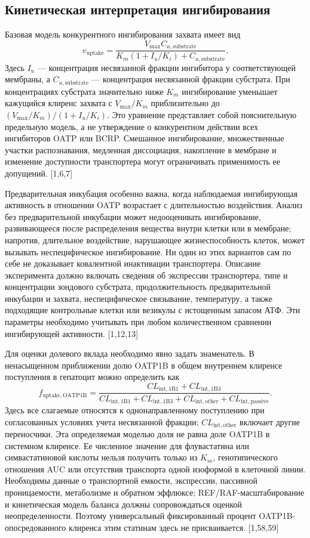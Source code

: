 \documentclass[11pt]{article}
\begin{document}
\subsection{Кинетическая интерпретация ингибирования}

Базовая модель конкурентного ингибирования захвата имеет вид
\[
v_{\mathrm{uptake}}=
\frac{V_{\max}C_{u,\mathrm{substrate}}}
{K_m\left(1+I_u/K_i\right)+C_{u,\mathrm{substrate}}}.
\]
Здесь \(I_u\) --- концентрация несвязанной фракции ингибитора у соответствующей мембраны, а \(C_{u,\mathrm{substrate}}\) --- концентрация несвязанной фракции субстрата. При концентрациях субстрата значительно ниже \(K_m\) ингибирование уменьшает кажущийся клиренс захвата с \(V_{\max}/K_m\) приблизительно до \((V_{\max}/K_m)/(1+I_u/K_i)\). Это уравнение представляет собой пояснительную предельную модель, а не утверждение о конкурентном действии всех ингибиторов OATP или BCRP. Смешанное ингибирование, множественные участки распознавания, медленная диссоциация, накопление в мембране и изменение доступности транспортера могут ограничивать применимость ее допущений. [1,6,7]

Предварительная инкубация особенно важна, когда наблюдаемая ингибирующая активность в отношении OATP возрастает с длительностью воздействия. Анализ без предварительной инкубации может недооценивать ингибирование, развивающееся после распределения вещества внутри клетки или в мембране; напротив, длительное воздействие, нарушающее жизнеспособность клеток, может вызывать неспецифическое ингибирование. Ни один из этих вариантов сам по себе не доказывает ковалентной инактивации транспортера. Описание эксперимента должно включать сведения об экспрессии транспортера, типе и концентрации зондового субстрата, продолжительность предварительной инкубации и захвата, неспецифическое связывание, температуру, а также подходящие контрольные клетки или везикулы с истощенным запасом АТФ. Эти параметры необходимо учитывать при любом количественном сравнении ингибирующей активности. [1,12,13]

Для оценки долевого вклада необходимо явно задать знаменатель. В ненасыщенном приближении долю OATP1B в общем внутреннем клиренсе поступления в гепатоцит можно определить как
\[
f_{\mathrm{uptake,OATP1B}}=
\frac{CL_{\mathrm{int,1B1}}+CL_{\mathrm{int,1B3}}}
{CL_{\mathrm{int,1B1}}+CL_{\mathrm{int,1B3}}+
 CL_{\mathrm{int,other}}+CL_{\mathrm{int,passive}}}.
\]
Здесь все слагаемые относятся к однонаправленному поступлению при согласованных условиях учета несвязанной фракции; \(CL_{\mathrm{int,other}}\) включает другие переносчики. Эта определяемая моделью доля не равна доле OATP1B в системном клиренсе. Ее численное значение для флувастатина или симвастатиновой кислоты нельзя получить только из \(K_m\), генотипического отношения AUC или отсутствия транспорта одной изоформой в клеточной линии. Необходимы данные о транспортной емкости, экспрессии, пассивной проницаемости, метаболизме и обратном эффлюксе; REF/RAF-масштабирование и кинетическая модель баланса должны сопровождаться оценкой неопределенности. Поэтому универсальный фиксированный процент OATP1B-опосредованного клиренса этим статинам здесь не присваивается. [1,58,59]
\end{document}
